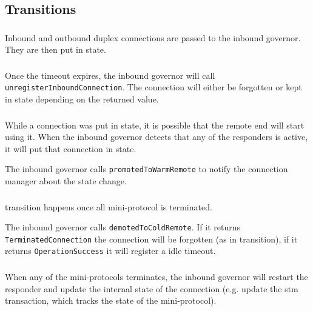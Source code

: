 \subsection{Transitions}

\subsubsection{\NewConnection}
Inbound and outbound duplex connections are passed to the inbound governor.
They are then put in \RemoteIdle{} state.

\subsubsection{\CommitRemote}
Once the \RemoteIdle{} timeout expires, the inbound governor will call
\texttt{unregisterInboundConnection}.  The
connection will either be forgotten or kept in \RemoteCold{} state depending on the returned value.

\subsubsection{\AwakeRemote}
While a connection was put in \RemoteIdle{} state, it is possible that the
remote end will start using it.  When the inbound governor detects that any
of the responders is active, it will put that connection in \RemoteWarm{} state.

\begin{detail}
  The inbound governor calls \texttt{promotedToWarmRemote} to notify the
  connection manager about the state change.
\end{detail}

\subsubsection{\WaitIdleRemote}
\WaitIdleRemote{} transition happens once all mini-protocol is terminated.

\begin{detail}
  The inbound governor calls \texttt{demotedToColdRemote}.   If it returns
  \texttt{TerminatedConnection} the connection will be forgotten (as in
  \MuxTerminated{} transition), if it returns \texttt{OperationSuccess} it will
  register a idle timeout.
\end{detail}

\subsubsection{\MiniProtocolTerminated}
When any of the mini-protocols terminates, the inbound governor will restart the
responder and update the internal state of the connection (e.g. update the stm
transaction, which tracks the state of the mini-protocol).

